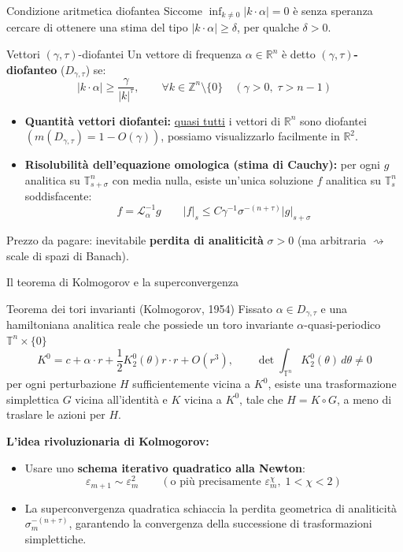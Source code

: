 \documentclass[10pt,aspectratio=169]{beamer}
\newcommand{\T}{\mathbb{T}}
\newcommand{\R}{\mathbb{R}}
\newcommand{\Z}{\mathbb{Z}}
\newcommand{\eps}{\varepsilon}
\newcommand{\blu}[1]{\textcolor{UniBlue}{\textbf{#1}}}
\begin{document}
\begin{frame}{Condizione aritmetica diofantea}
  Siccome $\inf_{k \neq 0} |k \cdot \alpha| = 0$ è senza speranza cercare di ottenere una stima del tipo $|k \cdot \alpha| \geq \delta$, per qualche $\delta > 0$.
  \begin{block}{Vettori $(\gamma, \tau)$-diofantei}
    Un vettore di frequenza $\alpha \in \R^n$ è detto \blu{$(\gamma, \tau)$-diofanteo} ($D_{\gamma, \tau}$) se:
    \[
      |k \cdot \alpha| \ge \frac{\gamma}{|k|^\tau}, \qquad \forall k \in \Z^n \setminus \{0\} \quad (\gamma > 0, \; \tau > n - 1)
    \]
  \end{block}
  \pause
  \begin{itemize}
    \item \blu{Quantità vettori diofantei:} \underline{quasi tutti} i vettori di $\R^n$ sono diofantei $(m(D_{\gamma, \tau}) = 1 - O(\gamma))$, possiamo visualizzarlo facilmente in $\R^2$. 
    \item \blu{Risolubilità dell'equazione omologica (stima di Cauchy):} per ogni $g$ analitica su $\T^n_{s+\sigma}$ con media nulla, esiste un'unica soluzione $f$ analitica su $\T^n_s$ soddisfacente:
    \[
      f = \mathcal{L}_\alpha^{-1}g \qquad |f|_s \le C \gamma^{-1} \sigma^{-(n+\tau)} |g|_{s+\sigma}
    \]
  \end{itemize}
  \alert{Prezzo da pagare:} inevitabile \textbf{perdita di analiticità} $\sigma > 0$ (ma arbitraria $\rightsquigarrow$ scale di spazi di Banach).
\end{frame}

\begin{frame}{Il teorema di Kolmogorov e la superconvergenza}
  \begin{block}{Teorema dei tori invarianti (Kolmogorov, 1954)}
    Fissato $\alpha \in D_{\gamma, \tau}$ e una hamiltoniana analitica reale che possiede un toro invariante $\alpha$-quasi-periodico $\T^n \times \{0\}$
    \[
      K^0 = c + \alpha \cdot r + \frac{1}{2}K^0_2(\theta)r \cdot r + O(r^3), \qquad \det \int_{\T^n} K^0_2(\theta) \, d\theta \neq 0
    \]
    per ogni perturbazione $H$ sufficientemente vicina a $K^0$, esiste una trasformazione simplettica $G$ vicina all'identità e $K$ vicina a $K^0$, tale che $H = K \circ G$, a meno di traslare le azioni per $H$.
  \end{block}
  \pause
  \blu{L'idea rivoluzionaria di Kolmogorov:}
  \begin{itemize}
    \item Usare uno \textbf{schema iterativo quadratico alla Newton}:
    \[
      \eps_{m+1} \sim \eps_m^2 \qquad (\text{o più precisamente } \eps_m^{\chi}, \; 1 < \chi < 2)
    \]
    \item La \alert{superconvergenza} quadratica schiaccia la perdita geometrica di analiticità $\sigma_m^{-(n+\tau)}$, garantendo la convergenza della successione di trasformazioni simplettiche.
  \end{itemize}
\end{frame}
\end{document}

